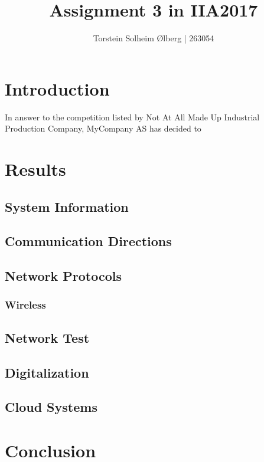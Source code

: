 \documentclass[11pt, A4paper, english]{article}
\author{Torstein Solheim Ølberg | 263054}
\title{Assignment 3 in IIA2017}
\begin{document}
\maketitle
\clearpage

\tableofcontents
\clearpage

	\section{Introduction}
In answer to the competition listed by Not At All Made Up Industrial Production Company, MyCompany AS has decided to 

	\section{Results}
		\subsection{System Information}


		\subsection{Communication Directions}


		\subsection{Network Protocols}


			\subsubsection{Wireless}


		\subsection{Network Test}


		\subsection{Digitalization}


		\subsection{Cloud Systems}



	\section{Conclusion}
\end{document}

